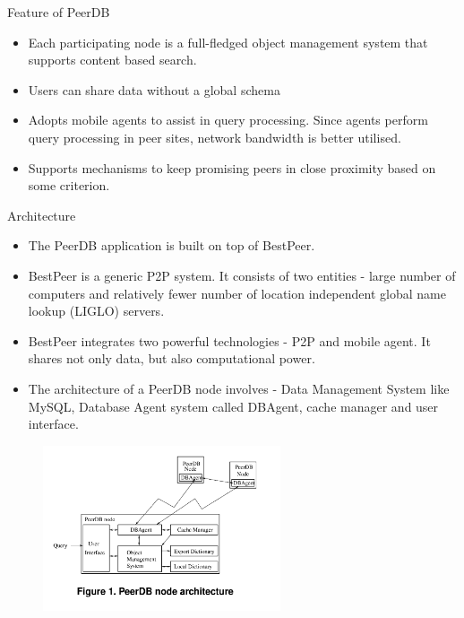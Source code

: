 \documentclass[9pt]{beamer}
\begin{document}
\begin{frame}{Feature of PeerDB}
    \begin{itemize}
    \item Each participating node is a full-fledged object management system that supports content based search.
\item Users can share data without a global schema
\item Adopts mobile agents to assist in query processing. Since agents perform query processing in peer sites, network bandwidth is better utilised. 
\item Supports mechanisms to keep promising peers in close proximity based on some criterion.
\end{itemize}
\end{frame}

\begin{frame}{Architecture}
    \begin{itemize}
        \item The PeerDB application is built on top of  BestPeer.
        \item BestPeer is a generic P2P system. It consists of two entities - large number of computers and relatively fewer number of location independent global name lookup (LIGLO) servers.
        \item BestPeer integrates two powerful technologies - P2P and mobile agent. It shares not only data, but also computational power. 
        \item The architecture of a PeerDB node involves - Data Management System like MySQL, Database Agent system called DBAgent, cache manager and user interface. 
    \end{itemize}
\end{frame}

\begin{frame}{}
    \begin{figure}
      \centering
      \includegraphics[width=7cm]{arch.png}
  \end{figure}
\end{frame}
\end{document}
